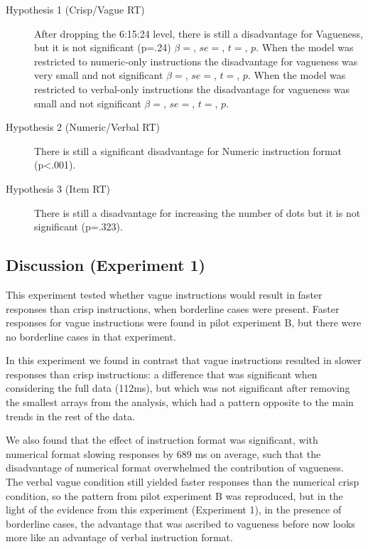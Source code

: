 \begin{description}
\item [Hypothesis 1 (Crisp/Vague RT)] After dropping the 6:15:24 level, there is still a disadvantage for Vagueness, but it is not significant (p=.24) $\beta=$, $se=$, $t=$, $p$. When the model was restricted to numeric-only instructions the disadvantage for vagueness was very small and not significant $\beta=$, $se=$, $t=$, $p$. When the model was restricted to verbal-only instructions the disadvantage for vagueness was small and not significant $\beta=$, $se=$, $t=$, $p$.
\item [Hypothesis 2 (Numeric/Verbal RT)] There is still a significant disadvantage for Numeric instruction format (p<.001).
\item [Hypothesis 3 (Item RT)] There is still a disadvantage for increasing the number of dots but it is not significant (p=.323). 
\end{description}

\subsection{Discussion (Experiment 1)}


This experiment tested whether vague instructions would result in faster responses than crisp instructions, when borderline cases were present. Faster responses for vague instructions were found in pilot experiment B, but there were no borderline cases in that experiment.

In this experiment we found in contrast that vague instructions resulted in slower responses than crisp instructions: a difference that was significant when considering the full data (112ms), but which was not significant after removing the smallest arrays from the analysis, which had a pattern opposite to the main trends in the rest of the data.

We also found that the effect of instruction format was significant, with numerical format slowing responses by 689 ms on average, such that the disadvantage of numerical format overwhelmed the contribution of vagueness. The verbal vague condition still yielded faster responses than the numerical crisp condition, so the pattern from pilot experiment B was reproduced, but in the light of the evidence from this experiment (Experiment 1), in the presence of borderline cases, the advantage that was ascribed to vagueness before now looks more like an advantage of verbal instruction format.

